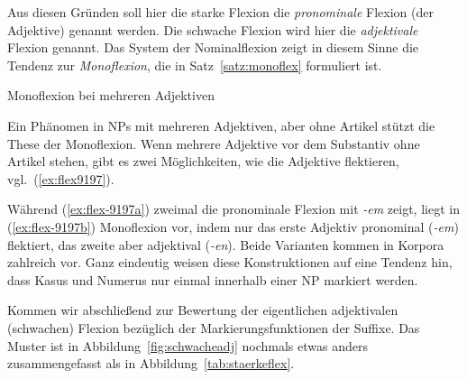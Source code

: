 Aus diesen Gründen soll hier die starke Flexion die \textit{pronominale} Flexion (der Adjektive) genannt werden.
Die schwache Flexion wird hier die \textit{adjektivale} Flexion genannt.
Das System der Nominalflexion zeigt in diesem Sinne die Tendenz zur \textit{Monoflexion}, die in Satz~\ref{satz:monoflex} formuliert ist.


\begin{Vertiefung}{Monoflexion bei mehreren Adjektiven}
  
\noindent Ein Phänomen in NPs mit mehreren Adjektiven, aber ohne Artikel stützt die These der Monoflexion.
Wenn mehrere Adjektive vor dem Substantiv ohne Artikel stehen, gibt es zwei Möglichkeiten, wie die Adjektive flektieren, vgl.\ (\ref{ex:flex9197}).

\begin{exe}
  \ex \label{ex:flex9197}
  \begin{xlist}
  \end{xlist}
\end{exe}

Während (\ref{ex:flex-9197a}) zweimal die pronominale Flexion mit \textit{-em} zeigt, liegt in (\ref{ex:flex-9197b}) Monoflexion vor, indem nur das erste Adjektiv pronominal (\textit{-em}) flektiert, das zweite aber adjektival (\textit{-en}).
Beide Varianten kommen in Korpora zahlreich vor.
Ganz eindeutig weisen diese Konstruktionen auf eine Tendenz hin, dass Kasus und Numerus nur einmal innerhalb einer NP markiert werden.

\end{Vertiefung}


Kommen wir abschließend zur Bewertung der eigentlichen adjektivalen (schwachen) Flexion bezüglich der Markierungsfunktionen der Suffixe.
Das Muster ist in Abbildung~\ref{fig:schwacheadj} nochmals etwas anders zusammengefasst als in Abbildung~\ref{tab:staerkeflex}.

